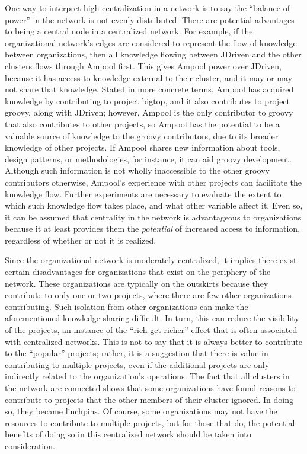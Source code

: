 One way to interpret high centralization in a network is to say the ``balance of power'' in the network is not evenly distributed. There are potential advantages to being a central node in a centralized network. For example, if the organizational network's edges are considered to represent the flow of knowledge between organizations, then all knowledge flowing between JDriven and the other clusters flows through Ampool first. This gives Ampool power over JDriven, because it has access to knowledge external to their cluster, and it may or may not share that knowledge. Stated in more concrete terms, Ampool has acquired knowledge by contributing to project bigtop, and it also contributes to project groovy, along with JDriven; however, Ampool is the only contributor to groovy that also contributes to other projects, so Ampool has the potential to be a valuable source of knowledge to the groovy contributors, due to its broader knowledge of other projects. If Ampool shares new information about tools, design patterns, or methodologies, for instance, it can aid groovy development. Although such information is not wholly inaccessible to the other groovy contributors otherwise, Ampool's experience with other projects can facilitate the knowledge flow. Further experiments are necessary to evaluate the extent to which such knowledge flow takes place, and what other variable affect it. Even so, it can be assumed that centrality in the network is advantageous to organizations because it at least provides them the \textit{potential} of increased access to information, regardless of whether or not it is realized.

Since the organizational network is moderately centralized, it implies there exist certain disadvantages for organizations that exist on the periphery of the network. These organizations are typically on the outskirts because they contribute to only one or two projects, where there are few other organizations contributing. Such isolation from other organizations can make the aforementioned knowledge sharing difficult. In turn, this can reduce the visibility of the projects, an instance of the ``rich get richer'' effect that is often associated with centralized networks. This is not to say that it is always better to contribute to the ``popular'' projects; rather, it is a suggestion that there is value in contributing to multiple projects, even if the additional projects are only indirectly related to the organization's operations. The fact that all clusters in the network are connected shows that some organizations have found reasons to contribute to projects that the other members of their cluster ignored. In doing so, they became linchpins. Of course, some organizations may not have the resources to contribute to multiple projects, but for those that do, the potential benefits of doing so in this centralized network should be taken into consideration.

